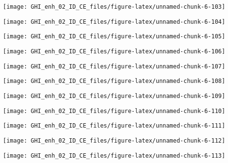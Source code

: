 \documentclass[
  10pt,
  a4paper,oneside]{article}
\begin{document}
\begin{center}\texttt{[image: GHI\_enh\_02\_ID\_CE\_files/figure-latex/unnamed-chunk-6-103]} \end{center}

\begin{center}\texttt{[image: GHI\_enh\_02\_ID\_CE\_files/figure-latex/unnamed-chunk-6-104]} \end{center}

\begin{center}\texttt{[image: GHI\_enh\_02\_ID\_CE\_files/figure-latex/unnamed-chunk-6-105]} \end{center}

\begin{center}\texttt{[image: GHI\_enh\_02\_ID\_CE\_files/figure-latex/unnamed-chunk-6-106]} \end{center}

\begin{center}\texttt{[image: GHI\_enh\_02\_ID\_CE\_files/figure-latex/unnamed-chunk-6-107]} \end{center}

\begin{center}\texttt{[image: GHI\_enh\_02\_ID\_CE\_files/figure-latex/unnamed-chunk-6-108]} \end{center}

\begin{center}\texttt{[image: GHI\_enh\_02\_ID\_CE\_files/figure-latex/unnamed-chunk-6-109]} \end{center}

\begin{center}\texttt{[image: GHI\_enh\_02\_ID\_CE\_files/figure-latex/unnamed-chunk-6-110]} \end{center}

\begin{center}\texttt{[image: GHI\_enh\_02\_ID\_CE\_files/figure-latex/unnamed-chunk-6-111]} \end{center}

\begin{center}\texttt{[image: GHI\_enh\_02\_ID\_CE\_files/figure-latex/unnamed-chunk-6-112]} \end{center}

\begin{center}\texttt{[image: GHI\_enh\_02\_ID\_CE\_files/figure-latex/unnamed-chunk-6-113]} \end{center}
\end{document}
